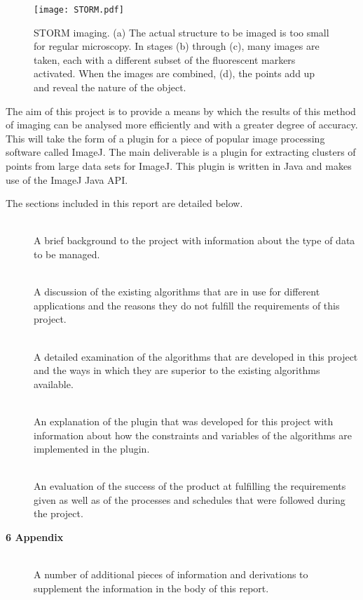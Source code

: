 \begin{figure}[tbh]
	\centering
	\texttt{[image: STORM.pdf]}

	\caption[Creation of a STORM image.]{STORM imaging. (a) The actual
		structure to be imaged is too small for regular microscopy. In stages
		(b) through (c), many images are taken, each with a different subset of
		the fluorescent markers activated. When the images are combined, (d),
		the points add up and reveal the nature of the object.}\label{fig:STORM}
\end{figure}

The aim of this project is to provide a means by which the results of this
method of imaging can be analysed more efficiently and with a greater degree of
accuracy. This will take the form of a plugin for a piece of popular image
processing software called ImageJ. The main deliverable is a plugin for
extracting clusters of points from large data sets for ImageJ. This plugin is
written in Java and makes use of the ImageJ Java API\cite{imagejapi}.

The sections included in this report are detailed below.

\begin{description}
	\item[] \hfill \\
		A brief background to the project with information about the type of
		data to be managed.

	\item[] \hfill \\
		A discussion of the existing algorithms that are in use for different
		applications and the reasons they do not fulfill the requirements of
		this project.

	\item[] \hfill \\
		A detailed examination of the algorithms that are developed in this
		project and the ways in which they are superior to the existing
		algorithms available.

	\item[] \hfill \\
		An explanation of the plugin that was developed for this project with
		information about how the constraints and variables of the algorithms
		are implemented in the plugin.

	\item[] \hfill \\
		An evaluation of the success of the product at fulfilling the
		requirements given as well as of the processes and schedules that were
		followed during the project.

	\item[\textbf{6 Appendix}] \hfill \\
		A number of additional pieces of information and derivations to
		supplement the information in the body of this report.
\end{description}
